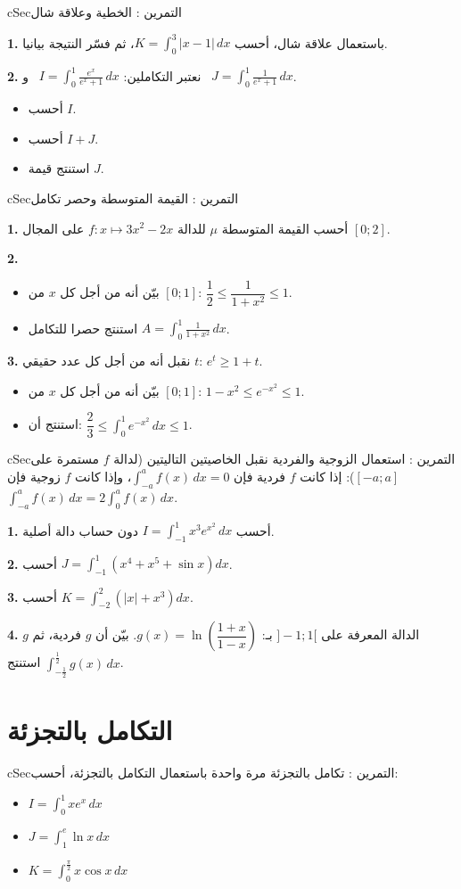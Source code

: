 \documentclass[12pt,a4paper]{article}
\newenvironment{BOX}[2]{\begin{otherlanguage}{english}\begin{arbox}{#1}{#2}}{\end{arbox}\end{otherlanguage}}
\newcounter{exo}
\newenvironment{tamrin}[1]{\stepcounter{exo}\begin{BOX}{cSec}{التمرين \theexo: #1}}{\end{BOX}}
\newenvironment{sq}{\begin{itemize}[leftmargin=2.4em,itemsep=3pt]}{\end{itemize}}
\newcommand{\qa}{\item[(أ)]}\newcommand{\qb}{\item[(ب)]}\newcommand{\qc}{\item[(جـ)]}\newcommand{\qd}{\item[(د)]}\newcommand{\qe}{\item[(هـ)]}
\newcommand{\QQ}[1]{\par\smallskip\textbf{#1.} }
\begin{document}
\begin{tamrin}{الخطية وعلاقة شال}
\QQ{1} باستعمال علاقة شال، أحسب $K=\displaystyle\int_{0}^{3}|x-1|\,dx$، ثم فسّر النتيجة بيانيا.
\QQ{2} نعتبر التكاملين: $I=\displaystyle\int_{0}^{1}\frac{e^{x}}{e^{x}+1}\,dx$ \ و \ $J=\displaystyle\int_{0}^{1}\frac{1}{e^{x}+1}\,dx$.
\begin{sq}
\qa أحسب $I$.
\qb أحسب $I+J$.
\qc استنتج قيمة $J$.
\end{sq}
\end{tamrin}

\begin{tamrin}{القيمة المتوسطة وحصر تكامل}
\QQ{1} أحسب القيمة المتوسطة $\mu$ للدالة $f:x\mapsto3x^{2}-2x$ على المجال $[0;2]$.
\QQ{2}
\begin{sq}
\qa بيّن أنه من أجل كل $x$ من $[0;1]$: $\dfrac12\leqslant\dfrac{1}{1+x^{2}}\leqslant1$.
\qb استنتج حصرا للتكامل $A=\displaystyle\int_0^1\frac{1}{1+x^{2}}\,dx$.
\end{sq}
\QQ{3} نقبل أنه من أجل كل عدد حقيقي $t$: $e^{t}\geqslant1+t$.
\begin{sq}
\qa بيّن أنه من أجل كل $x$ من $[0;1]$: $1-x^{2}\leqslant e^{-x^{2}}\leqslant1$.
\qb استنتج أن: $\dfrac23\leqslant\displaystyle\int_0^1e^{-x^{2}}\,dx\leqslant1$.
\end{sq}
\end{tamrin}

\begin{tamrin}{استعمال الزوجية والفردية}
نقبل الخاصيتين التاليتين (لدالة $f$ مستمرة على $[-a;a]$):
إذا كانت $f$ فردية فإن $\displaystyle\int_{-a}^{a}f(x)\,dx=0$، وإذا كانت $f$ زوجية فإن $\displaystyle\int_{-a}^{a}f(x)\,dx=2\int_{0}^{a}f(x)\,dx$.
\QQ{1} أحسب $I=\displaystyle\int_{-1}^{1}x^{3}e^{x^{2}}\,dx$ دون حساب دالة أصلية.
\QQ{2} أحسب $J=\displaystyle\int_{-1}^{1}\left(x^{4}+x^{5}+\sin x\right)dx$.
\QQ{3} أحسب $K=\displaystyle\int_{-2}^{2}\left(|x|+x^{3}\right)dx$.
\QQ{4} $g$ الدالة المعرفة على $]-1;1[$ بـ: $g(x)=\ln\left(\dfrac{1+x}{1-x}\right)$. بيّن أن $g$ فردية، ثم استنتج $\displaystyle\int_{-\frac12}^{\frac12}g(x)\,dx$.
\end{tamrin}

\section{التكامل بالتجزئة}

\begin{tamrin}{تكامل بالتجزئة مرة واحدة}
باستعمال التكامل بالتجزئة، أحسب:
\begin{sq}
\qa $I=\displaystyle\int_0^1xe^{x}\,dx$
\qb $J=\displaystyle\int_1^e\ln x\,dx$
\qc $K=\displaystyle\int_0^{\frac{\pi}{2}}x\cos x\,dx$
\end{sq}
\end{tamrin}
\end{document}
